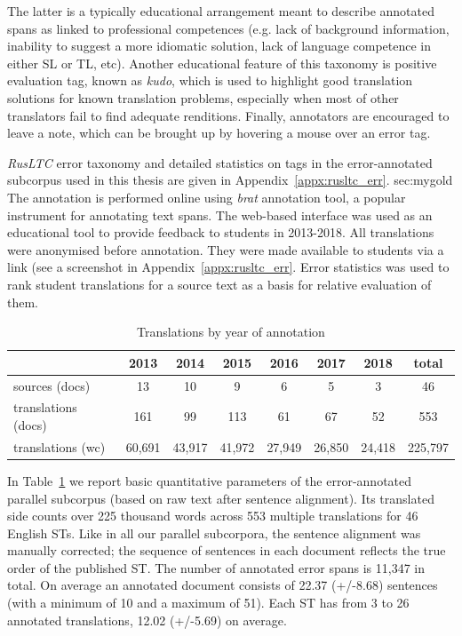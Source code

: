 The latter is a typically educational arrangement meant to describe annotated spans as linked to professional competences (e.g. lack of background information, inability to suggest a more idiomatic solution, lack of language competence in either SL or TL, etc). Another educational feature of this taxonomy is positive evaluation tag, known as \textit{kudo}, which is used to highlight good translation solutions for known translation problems, especially when most of other translators fail to find adequate renditions. 
Finally, annotators are encouraged to leave a note, which can be brought up by hovering a mouse over an error tag. 

\textit{RusLTC} error taxonomy and detailed statistics on tags in the error-annotated subcorpus used in this thesis are given in Appendix~\ref{appx:rusltc_err}.
sec:mygold
The annotation is performed online using \textit{brat} annotation tool, a popular instrument for annotating text spans. The web-based interface was used as an educational tool to provide feedback to students in 2013-2018. All translations were anonymised before annotation. They were made available to students via a link (see a screenshot in Appendix~\ref{appx:rusltc_err}.   
Error statistics was used to rank student translations for a source text as a basis for relative evaluation of them.

\begin{table}[H]
	\centering
	\begin{tabular}{l|c|c|c|c|c|c|c}
		\toprule
		
		&   2013  &   2014  & 2015  &  2016  & 2017  & 2018 & total \\
		\midrule				
		sources (docs)      & 13 & 10 & 9 &  6 & 5 & 3 & 46 \\
		translations (docs) & 161  & 99 & 113 & 61  & 67 &  52 & 553 \\
		translations (wc)   & 60,691 & 43,917 & 41,972 & 27,949  & 26,850 & 24,418 & 225,797 \\
		\bottomrule
	\end{tabular}
	\caption{\label{tab:by_year}Translations by year of annotation}
\end{table} 

In Table~\ref{tab:by_year} we report basic quantitative parameters of the error-annotated parallel subcorpus (based on raw text after sentence alignment). Its translated side counts over 225 thousand words across 553 multiple translations for 46 English STs. Like in all our parallel subcorpora, the sentence alignment was manually corrected; the sequence of sentences in each document reflects the true order of the published ST. The number of annotated error spans is 11,347 in total. On average an annotated document consists of 22.37 (+/-8.68) sentences (with a minimum of 10 and a maximum of 51). Each ST has from 3 to 26 annotated translations, 12.02 (+/-5.69) on average.

